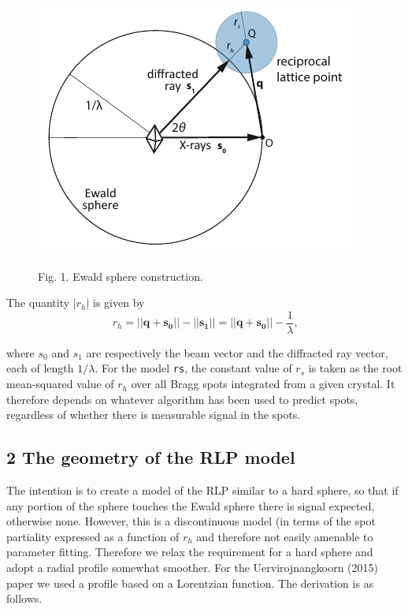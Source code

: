 \documentclass[12pt, letterpaper]{article}
\begin{document}
  \begin{figure}[htb]
  \begin{center}
  \includegraphics[scale=1.5]{Figure_1.pdf}
  \label{fig:1}
  \end{center}
  \begin{center}
  {Fig. 1. Ewald sphere construction.}
  \end{center}
  \end{figure}

  The quantity $|{r_h}|$ is given by 
    \begin{equation}
    {r_h} = ||\mathbf{q}+\mathbf{s_0}||-||\mathbf{s_1}|| = ||\mathbf{q}+\mathbf{s_0}||-\dfrac{1}{ \lambda}
    \text{,}
    \label{eqn:Rh}
  \end{equation}

  where ${s_0}$ and ${s_1}$ are respectively the beam vector and the diffracted ray vector,
  each of length $1/\lambda$.  For the model {\tt rs}, the constant value of ${r_s}$ is taken 
  as the root mean-squared value of
  ${r_h}$ over all Bragg spots integrated from a given crystal.  It therefore depends on whatever
  algorithm has been used to predict spots, regardless of whether there is measurable signal
  in the spots.  
  \subsection*{2 The geometry of the RLP model}

  \par The intention is to create a model of the RLP similar to a hard sphere, so that if any portion 
  of the sphere touches the Ewald sphere there is signal expected, otherwise none.  However, this 
  is a discontinuous model (in terms of the spot partiality expressed as a function of ${r_h}$ and
  therefore not easily amenable to parameter fitting.  Therefore we relax the requirement for a hard
  sphere and adopt a radial profile somewhat smoother.  For the Uervirojnangkoorn (2015) paper
  we used a profile based on a Lorentzian function.  The derivation is as follows.  
  
\end{document}
